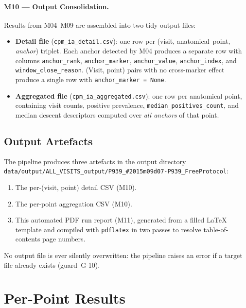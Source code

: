 \documentclass[a4paper,11pt]{article}
\begin{document}
\paragraph{M10 --- Output Consolidation.}
Results from M04--M09 are assembled into two tidy output files:
\begin{itemize}
  \item \textbf{Detail file} (\texttt{cpm\_ia\_detail.csv}): one row per
        (visit, anatomical~point, \emph{anchor}) triplet. Each anchor detected by M04
        produces a separate row with columns \texttt{anchor\_rank},
        \texttt{anchor\_marker}, \texttt{anchor\_value}, \texttt{anchor\_index},
        and \texttt{window\_close\_reason}.
        (Visit, point) pairs with no cross-marker effect produce a single row with
        \texttt{anchor\_marker = None}.
  \item \textbf{Aggregated file} (\texttt{cpm\_ia\_aggregated.csv}): one row per
        anatomical point, containing visit counts, positive prevalence,
        \texttt{median\_positives\_count}, and median descent descriptors computed over
        \emph{all anchors} of that point.
\end{itemize}

\subsection{Output Artefacts}

The pipeline produces three artefacts in the output directory \texttt{data/output/ALL\_VISITS\_output/P939\_\#2015m09d07-P939\_FreeProtocol}:
\begin{enumerate}
  \item The per-(visit, point) detail CSV (M10).
  \item The per-point aggregation CSV (M10).
  \item This automated PDF run report (M11), generated from a filled \LaTeX{} template
        and compiled with \texttt{pdflatex} in two passes to resolve table-of-contents
        page numbers.
\end{enumerate}
No output file is ever silently overwritten: the pipeline raises an error if a target
file already exists (guard~G-10).

\section{Per-Point Results}
\end{document}
